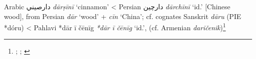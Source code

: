 \begin{etymology}\label{ety:darsini}
Arabic {دارصيني} \textit{dārṣīnī} `cinnamon'
< Persian {دارچین} \textit{dārchīnī} `id.' [Chinese wood], from Persian \textit{dār} `wood' + \textit{cīn} `China'; cf. cognates Sanskrit \textit{dāru} (PIE *dóru)
< Pahlavi {*dār ī čēnīg} \textit{*dār ī čēnīg} `id.', (cf. Armenian \textit{daričenik})\footnote{\textcite[311]{wehr_dictionary_1976}; \textcite{dietrich_dar_1960}; \textcite{alam_darcini_2011}}
\end{etymology}